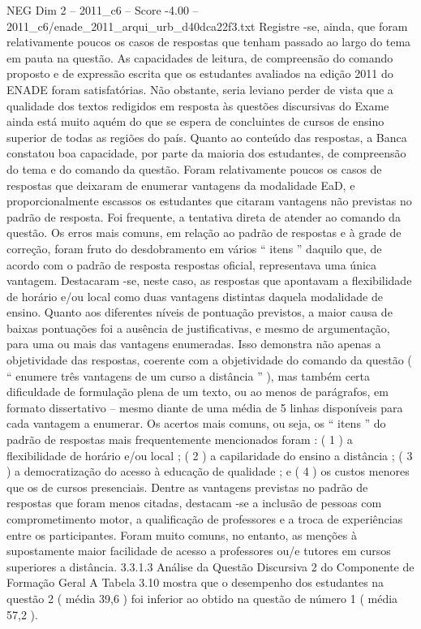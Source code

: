 \begin{textsample}{NEG Dim 2 – 2011\_c6 – Score -4.00 – 2011\_c6/enade\_2011\_arqui\_urb\_d40dca22f3.txt}
Registre -se, ainda, que foram relativamente poucos os casos de respostas que tenham passado ao largo do tema em pauta na questão.
As capacidades de leitura, de compreensão do comando proposto e de expressão escrita que os estudantes avaliados na edição 2011 do ENADE foram satisfatórias.
Não obstante, seria leviano perder de vista que a qualidade dos textos redigidos em resposta às questões discursivas do Exame ainda está muito aquém do que se espera de concluintes de cursos de ensino superior de todas as regiões do país.
Quanto ao conteúdo das respostas, a Banca constatou boa capacidade, por parte da maioria dos estudantes, de compreensão do tema e do comando da questão.
Foram relativamente poucos os casos de respostas que deixaram de enumerar vantagens da modalidade EaD, e proporcionalmente escassos os estudantes que citaram vantagens não previstas no padrão de resposta.
Foi frequente, a tentativa direta de atender ao comando da questão.
Os erros mais comuns, em relação ao padrão de respostas e à grade de correção, foram fruto do desdobramento em vários “ itens ” daquilo que, de acordo com o padrão de resposta respostas oficial, representava uma única vantagem.
Destacaram -se, neste caso, as respostas que apontavam a flexibilidade de horário e/ou local como duas vantagens distintas daquela modalidade de ensino.
Quanto aos diferentes níveis de pontuação previstos, a maior causa de baixas pontuações foi a ausência de justificativas, e mesmo de argumentação, para uma ou mais das vantagens enumeradas.
Isso demonstra não apenas a objetividade das respostas, coerente com a objetividade do comando da questão ( “ enumere três vantagens de um curso a distância ” ), mas também certa dificuldade de formulação plena de um texto, ou ao menos de parágrafos, em formato dissertativo – mesmo diante de uma média de 5 linhas disponíveis para cada vantagem a enumerar.
Os acertos mais comuns, ou seja, os “ itens ” do padrão de respostas mais frequentemente mencionados foram : ( 1 ) a flexibilidade de horário e/ou local ; ( 2 ) a capilaridade do ensino a distância ; ( 3 ) a democratização do acesso à educação de qualidade ; e ( 4 ) os custos menores que os de cursos presenciais.
Dentre as vantagens previstas no padrão de respostas que foram menos citadas, destacam -se a inclusão de pessoas com comprometimento motor, a qualificação de professores e a troca de experiências entre os participantes.
Foram muito comuns, no entanto, as menções à supostamente maior facilidade de acesso a professores ou/e tutores em cursos superiores a distância. 3.3.1.3 Análise da Questão Discursiva 2 do Componente de Formação Geral A Tabela 3.10 mostra que o desempenho dos estudantes na questão 2 ( média 39,6 ) foi inferior ao obtido na questão de número 1 ( média 57,2 ).

\end{textsample}
